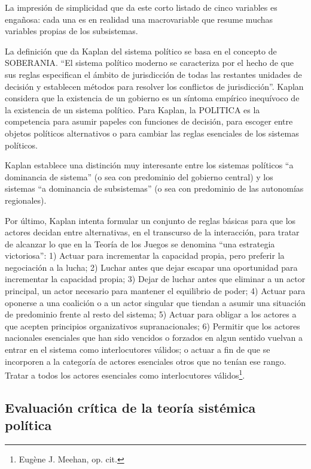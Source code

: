 \documentclass[
]{book}
\begin{document}
La impresión de simplicidad que da este corto listado de cinco variables es engañosa: cada una es en realidad una macrovariable que resume muchas variables propias de los subsistemas.

La definición que da Kaplan del sistema político se basa en el concepto de SOBERANIA. ``El sistema político moderno se caracteriza por el hecho de que sus reglas especifican el ámbito de jurisdicción de todas las restantes unidades de decisión y establecen métodos para resolver los conflictos de jurisdicción''. Kaplan considera que la existencia de un gobierno es un síntoma empírico inequívoco de la existencia de un sistema político. Para Kaplan, la POLITICA es la competencia para asumir papeles con funciones de decisión, para escoger entre objetos políticos alternativos o para cambiar las reglas esenciales de los sistemas políticos.

Kaplan establece una distinción muy interesante entre los sistemas políticos ``a dominancia de sistema'' (o sea con predominio del gobierno central) y los sistemas ``a dominancia de subsistemas'' (o sea con predominio de las autonomías regionales).

Por último, Kaplan intenta formular un conjunto de reglas básicas para que los actores decidan entre alternativas, en el transcurso de la interacción, para tratar de alcanzar lo que en la Teoría de los Juegos se denomina ``una estrategia victoriosa'': 1) Actuar para incrementar la capacidad propia, pero preferir la negociación a la lucha; 2) Luchar antes que dejar escapar una oportunidad para incrementar la capacidad propia; 3) Dejar de luchar antes que eliminar a un actor principal, un actor necesario para mantener el equilibrio de poder; 4) Actuar para oponerse a una coalición o a un actor singular que tiendan a asumir una situación de predominio frente al resto del sistema; 5) Actuar para obligar a los actores a que acepten principios organizativos supranacionales; 6) Permitir que los actores nacionales esenciales que han sido vencidos o forzados en algun sentido vuelvan a entrar en el sistema como interlocutores válidos; o actuar a fin de que se incorporen a la categoría de actores esenciales otros que no tenían ese rango. Tratar a todos los actores esenciales como interlocutores válidos\footnote{Eugène J. Meehan, op. cit.}.

\hypertarget{evaluaciuxf3n-cruxedtica-de-la-teoruxeda-sistuxe9mica-poluxedtica}{%
\subsection*{Evaluación crítica de la teoría sistémica política}\label{evaluaciuxf3n-cruxedtica-de-la-teoruxeda-sistuxe9mica-poluxedtica}}
\end{document}
